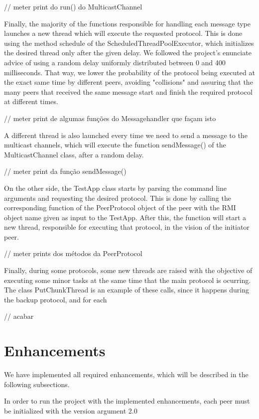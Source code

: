 \documentclass[11pt]{article}
\begin{document}
// meter print do run() do MulticastChannel

Finally, the majority of the functions responsible for handling each message type launches a new thread which will execute the requested protocol.
This is done using the method schedule of the ScheduledThreadPoolExecutor, which initializes the desired thread only after the given delay.
We followed the project's enunciate advice of using a random delay uniformly distributed between 0 and 400 milliseconds.
That way, we lower the probability of the protocol being executed at the exact same time by different peers, avoiding "collisions" and assuring that the many peers that received the same message start and finish the required protocol at different times.

// meter print de algumas funções do Messagehandler que façam isto

A different thread is also launched every time we need to send a message to the multicast channels, which will execute the function sendMessage() of the MulticastChannel class, after a random delay.

// meter print da função sendMessage()

On the other side, the TestApp class starts by parsing the command line arguments and requesting the desired protocol.
This is done by calling the corresponding function of the PeerProtocol object of the peer with the RMI object name given as input to the TestApp.
After this, the function will start a new thread, responsible for executing that protocol, in the vision of the initiator peer.

// meter prints dos métodos da PeerProtocol

Finally, during some protocols, some new threads are raised with the objective of executing some minor tasks at the same time that the main protocol is ocurring.
The class PutChunkThread is an example of these calls, since it happens during the backup protocol, and for each 

// acabar

\section{Enhancements}

We have implemented all required enhancements, which will be described in the following subsections.

In order to run the project with the implemented enhancements, each peer must be initialized with the version argument 2.0
\end{document}
